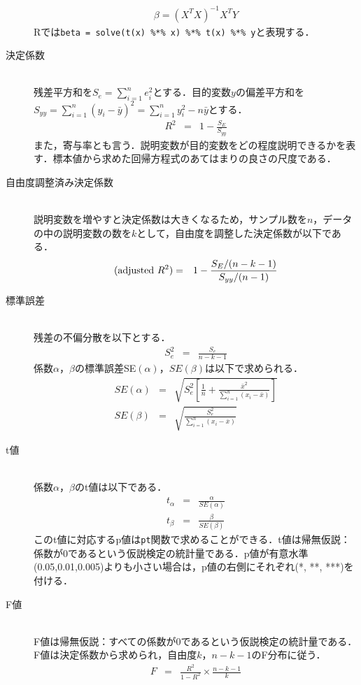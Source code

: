 \begin{description}
\begin{eqnarray*}
\beta=(X^T X)^{-1}X^T Y
\end{eqnarray*}
Rでは\verb+beta = solve(t(x) %*% x) %*% t(x) %*% y+と表現する．
\item[決定係数]\mbox{}\\
残差平方和を$S_e=\sum \limits^n _{i=1} e_i^2$とする．目的変数$y$の偏差平方和を$S_{yy}=\sum \limits^n _{i=1}\left( y_i -\bar{y} \right)^2=\sum \limits^n _{i=1}y_i^2-n\bar{y}$とする．
\begin{eqnarray*}
R^2&=&1-\frac{S_E}{S_{yy}}
\end{eqnarray*}
また，寄与率とも言う．説明変数が目的変数をどの程度説明できるかを表す．標本値から求めた回帰方程式のあてはまりの良さの尺度である．
\item[自由度調整済み決定係数]\mbox{}\\
説明変数を増やすと決定係数は大きくなるため，サンプル数を$n$，データの中の説明変数の数を$k$として，自由度を調整した決定係数が以下である．
\begin{eqnarray*}
({\rm adjusted}\ R^2)&=&1-\frac{S_E /(n-k-1)}{S_{yy} /(n-1)}
\end{eqnarray*}
\item[標準誤差]\mbox{}\\
残差の不偏分散を以下とする．
\begin{eqnarray*}
S_e^2&=&\frac{S_e}{n-k-1}
\end{eqnarray*}
係数$\alpha$，$\beta$の標準誤差SE$(\alpha)$，$SE(\beta)$は以下で求められる．
\begin{eqnarray*}
SE(\alpha)&=&\sqrt{S_e^2 \left[\frac{1}{n}+\frac{\bar{x}^2}{\sum \limits ^n _{i=1}\left( x_i-\bar{x} \right)}\right]}\\
SE(\beta)&=&\sqrt{\frac{S_e^2}{\sum \limits ^n _{i=1}\left( x_i-\bar{x} \right)}}
\end{eqnarray*}
\item[t値]\mbox{}\\
係数$\alpha$，$\beta$のt値は以下である．
\begin{eqnarray*}
t_\alpha &=&\frac{\alpha}{SE(\alpha)}\\
t_\beta &=&\frac{\beta}{SE(\beta)}
\end{eqnarray*}
このt値に対応するp値は{\tt pt}関数で求めることができる．t値は帰無仮説：係数が0であるという仮説検定の統計量である．p値が有意水準(0.05,0.01,0.005)よりも小さい場合は，p値の右側にそれぞれ(*, **, ***)を付ける．
\item[F値]\mbox{}\\
F値は帰無仮説：すべての係数が0であるという仮説検定の統計量である．F値は決定係数から求められ，自由度$k$，$n-k-1$のF分布に従う．
\begin{eqnarray*}
F&=&\frac{R^2}{1-R^2}\times\frac{n-k-1}{k}
\end{eqnarray*}
\end{description}